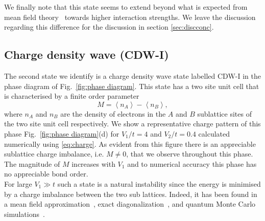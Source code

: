 \documentclass[aps,prx,10pt,twocolumn,floatfix,superscriptaddress,showpacs,numerical,footinbib]{revtex4-1}
\begin{document}
%
We finally note that this state seems to extend beyond what is expected from mean field theory~\cite{RQHZ08,WF10,GCC13} towards
higher interaction strengths.
%
We leave the discussion regarding this difference for the discussion in section \ref{sec:discconc}.

\subsection{Charge density wave (CDW-I)}
%
The second state we identify is a charge density wave state labelled CDW-I in the phase diagram of Fig.~\ref{fig:phase diagram}.
%
This state has a two site unit cell that is characterised by a finite order parameter
%
\begin{equation}
\label{eq:CDW}
%
M=\left\langle n_{A} \right\rangle-\left\langle n_{B}\right\rangle,
%
\end{equation}
%
where $n_{A}$ and $n_{B}$ are the density of electrons in the $A$ and $B$ sublattice sites of the two site unit cell respectively.
%
We show a representative charge pattern of this phase Fig.~\ref{fig:phase diagram}(d) for $V_{1}/t = 4$ and $V_{2}/t = 0.4$ 
calculated numerically using \eqref{eq:charge}.
%
As evident from this figure there is an appreciable sublattice charge imbalance, i.e. $M\neq 0$, that we observe throughout this phase.
%
The magnitude of $M$ increases with $V_{1}$ and to numerical accuracy this phase has no appreciable bond order.\\
%

For large $V_{1}\gg t$ such a state is a natural instability since the energy is minimised by a charge imbalance between the two sub lattices.
%
Indeed, it has been found in a mean field approximation~\cite{RQHZ08,WF10,GCC13}, exact diagonalization~\cite{GGNVC13,DH14,DCH14}, 
and quantum Monte Carlo simulations~\cite{WCT14}.
%
\end{document}
